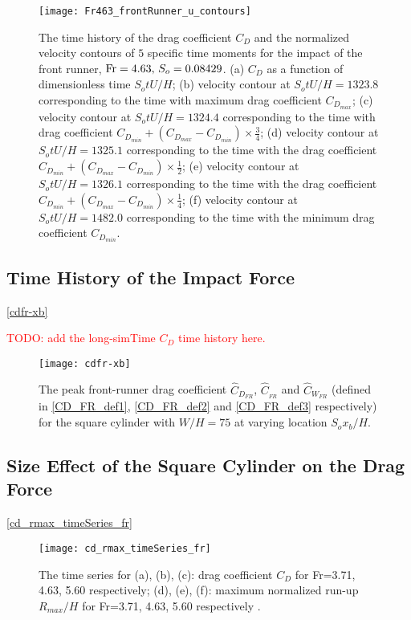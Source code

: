 \documentclass{jfm}
\newcommand{\fr}{{\rm{Fr}}}
\begin{document}
\begin{figure}
	\centerline{\texttt{[image: Fr463\_frontRunner\_u\_contours]}}
	\caption{The time history of the drag coefficient $C_D$ and the normalized velocity contours of $5$ specific time moments for the impact of the front runner, $\fr=4.63,\,S_o= 0.08429$. (a) $C_D$ as a function of dimensionless time $S_otU/H$; (b) velocity contour at $S_otU/H=1323.8$ corresponding to the time with maximum drag coefficient $C_{D_{max}}$; (c) velocity contour at $S_otU/H=1324.4$ corresponding to the time with drag coefficient $C_{D_{min}}+(C_{D_{max}}-C_{D_{min}})\times\frac{3}{4}$; (d) velocity contour at $S_otU/H=1325.1$ corresponding to the time with the drag coefficient  $C_{D_{min}}+(C_{D_{max}}-C_{D_{min}})\times\frac{1}{2}$; (e) velocity contour at $S_otU/H=1326.1$ corresponding to the time with the drag coefficient  $C_{D_{min}}+(C_{D_{max}}-C_{D_{min}})\times\frac{1}{4}$; (f) velocity contour at $S_otU/H=1482.0$ corresponding to the time with the minimum drag coefficient  $C_{D_{min}}$.} 
	\label{Fr463_frontRunner_u_contours}
\end{figure}


\subsection{Time History of the Impact Force}
\autoref{cdfr-xb}

\textcolor{Red}{TODO: add the long-simTime $C_D$ time history here.}


\begin{figure}
	\centerline{\texttt{[image: cdfr-xb]}}
	\caption{The peak front-runner drag coefficient $\hat{C}_{D_{FR}}$,  $\hat{C}_{_{FR}}$ and $\hat{C}_{W_{FR}}$ (defined in \autoref{CD_FR_def1},  \autoref{CD_FR_def2} and \autoref{CD_FR_def3} respectively) for the square cylinder with $W/H=75$ at varying location $S_ox_b/H$.}
	\label{cdfr-xb}
\end{figure}




\subsection{Size Effect of the Square Cylinder on the Drag Force}
\autoref{cd_rmax_timeSeries_fr}


\begin{figure}
	\centerline{\texttt{[image: cd\_rmax\_timeSeries\_fr]}}
	\caption{The time series for (a), (b), (c): drag coefficient $C_D$ for Fr=3.71, 4.63, 5.60 respectively; (d), (e), (f): maximum normalized run-up $R_{max}/H$ for Fr=3.71, 4.63, 5.60 respectively .}
	\label{cd_rmax_timeSeries_fr}
\end{figure}
\end{document}
